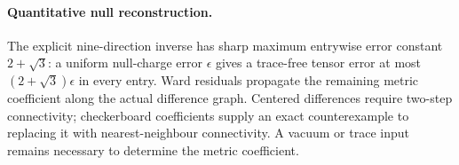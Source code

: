 \paragraph{Quantitative null reconstruction.}
The explicit nine-direction inverse has sharp maximum entrywise error
constant $2+\sqrt3$: a uniform null-charge error $\epsilon$ gives a
trace-free tensor error at most $(2+\sqrt3)\epsilon$ in every entry.
Ward residuals propagate the remaining metric coefficient along the actual
difference graph. Centered differences require two-step connectivity;
checkerboard coefficients supply an exact counterexample to replacing it
with nearest-neighbour connectivity. A vacuum or trace input remains
necessary to determine the metric coefficient.
